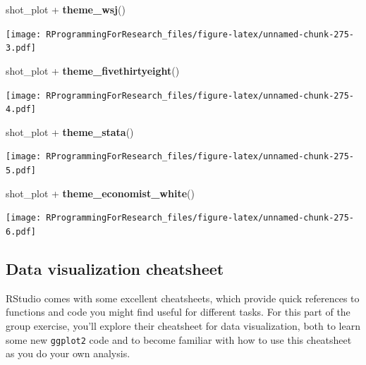 \documentclass[]{book}
\makeatletter
\newenvironment{Shaded}{\begin{snugshade}}{\end{snugshade}}
\newcommand{\KeywordTok}[1]{\textcolor[rgb]{0.13,0.29,0.53}{\textbf{{#1}}}}
\newcommand{\StringTok}[1]{\textcolor[rgb]{0.31,0.60,0.02}{{#1}}}
\newcommand{\NormalTok}[1]{{#1}}
\newenvironment{kframe}{%
\medskip{}
\setlength{\fboxsep}{.8em}
 \def\at@end@of@kframe{}%
 \ifinner\ifhmode%
  \def\at@end@of@kframe{\end{minipage}}%
  \begin{minipage}{\columnwidth}%
 \fi\fi%
 \def\FrameCommand##1{\hskip\@totalleftmargin \hskip-\fboxsep
 \colorbox{shadecolor}{##1}\hskip-\fboxsep
     \hskip-\linewidth \hskip-\@totalleftmargin \hskip\columnwidth}%
 \MakeFramed {\advance\hsize-\width
   \@totalleftmargin\z@ \linewidth\hsize
   \@setminipage}}%
 {\par\unskip\endMakeFramed%
 \at@end@of@kframe}
\renewenvironment{Shaded}{\begin{kframe}}{\end{kframe}}
\makeatother
\begin{document}
\begin{Shaded}
\begin{Highlighting}[]
\NormalTok{shot_plot +}\StringTok{ }\KeywordTok{theme_wsj}\NormalTok{()}
\end{Highlighting}
\end{Shaded}

\texttt{[image: RProgrammingForResearch\_files/figure-latex/unnamed-chunk-275-3.pdf]}

\begin{Shaded}
\begin{Highlighting}[]
\NormalTok{shot_plot +}\StringTok{ }\KeywordTok{theme_fivethirtyeight}\NormalTok{()}
\end{Highlighting}
\end{Shaded}

\texttt{[image: RProgrammingForResearch\_files/figure-latex/unnamed-chunk-275-4.pdf]}

\begin{Shaded}
\begin{Highlighting}[]
\NormalTok{shot_plot +}\StringTok{ }\KeywordTok{theme_stata}\NormalTok{()}
\end{Highlighting}
\end{Shaded}

\texttt{[image: RProgrammingForResearch\_files/figure-latex/unnamed-chunk-275-5.pdf]}

\begin{Shaded}
\begin{Highlighting}[]
\NormalTok{shot_plot +}\StringTok{ }\KeywordTok{theme_economist_white}\NormalTok{()}
\end{Highlighting}
\end{Shaded}

\texttt{[image: RProgrammingForResearch\_files/figure-latex/unnamed-chunk-275-6.pdf]}

\subsection{Data visualization
cheatsheet}\label{data-visualization-cheatsheet}

RStudio comes with some excellent cheatsheets, which provide quick
references to functions and code you might find useful for different
tasks. For this part of the group exercise, you'll explore their
cheatsheet for data visualization, both to learn some new
\texttt{ggplot2} code and to become familiar with how to use this
cheatsheet as you do your own analysis.
\end{document}
